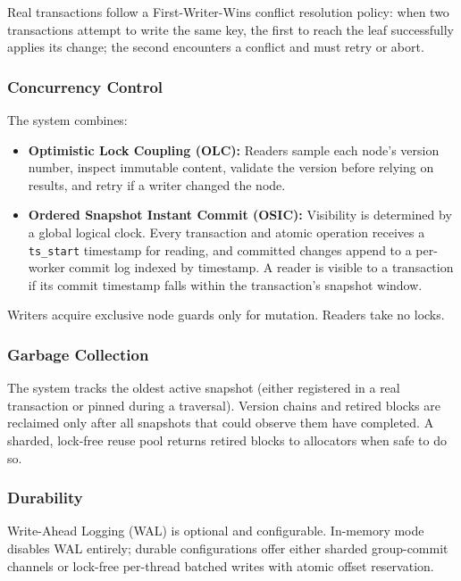 \documentclass[11pt]{article}
\newcommand{\code}[1]{\texttt{#1}}
\begin{document}
Real transactions follow a First-Writer-Wins conflict resolution policy: when two transactions
attempt to write the same key, the first to reach the leaf successfully applies its change;
the second encounters a conflict and must retry or abort.

\subsubsection{Concurrency Control}

The system combines:

\begin{itemize}
  \item \textbf{Optimistic Lock Coupling (OLC):} Readers sample each node's version number,
        inspect immutable content, validate the version before relying on results, and retry
        if a writer changed the node.

  \item \textbf{Ordered Snapshot Instant Commit (OSIC):} Visibility is determined by a global
        logical clock. Every transaction and atomic operation receives a \code{ts\_start}
        timestamp for reading, and committed changes append to a per-worker commit log indexed
        by timestamp. A reader is visible to a transaction if its commit timestamp falls within
        the transaction's snapshot window.
\end{itemize}

Writers acquire exclusive node guards only for mutation. Readers take no locks.

\subsubsection{Garbage Collection}

The system tracks the oldest active snapshot (either registered in a real transaction or pinned
during a traversal). Version chains and retired blocks are reclaimed only after all snapshots
that could observe them have completed. A sharded, lock-free reuse pool returns retired blocks
to allocators when safe to do so.

\subsubsection{Durability}

Write-Ahead Logging (WAL) is optional and configurable. In-memory mode disables WAL entirely;
durable configurations offer either sharded group-commit channels or lock-free per-thread
batched writes with atomic offset reservation.
\end{document}
